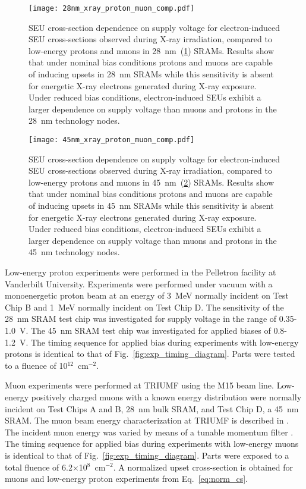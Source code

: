 \begin{figure}[tb]
    \begin{center}
        \texttt{[image: 28nm\_xray\_proton\_muon\_comp.pdf]}
    \end{center}
    \caption{SEU cross-section dependence on supply voltage for electron-induced SEU cross-sections observed during X-ray irradiation, compared to low-energy protons and muons in 28~nm~(\ref{fig:28nm_xray_muon_proton}) SRAMs. Results show that under nominal bias conditions protons and muons are capable of inducing upsets in 28~nm SRAMs while this sensitivity is absent for energetic X-ray electrons generated during X-ray exposure. Under reduced bias conditions, electron-induced SEUs exhibit a larger dependence on supply voltage than muons and protons in the 28~nm technology nodes.}
    \label{fig:28nm_xray_muon_proton}
\end{figure}
\begin{figure}[tb]
    \begin{center}
        \texttt{[image: 45nm\_xray\_proton\_muon\_comp.pdf]}
    \end{center}
    \caption{SEU cross-section dependence on supply voltage for electron-induced SEU cross-sections observed during X-ray irradiation, compared to low-energy protons and muons in 45~nm~(\ref{fig:45nm_xray_muon_proton}) SRAMs. Results show that under nominal bias conditions protons and muons are capable of inducing upsets in 45~nm SRAMs while this sensitivity is absent for energetic X-ray electrons generated during X-ray exposure. Under reduced bias conditions, electron-induced SEUs exhibit a larger dependence on supply voltage than muons and protons in the 45~nm technology nodes.}
    \label{fig:45nm_xray_muon_proton}
\end{figure}

Low-energy proton experiments were performed in the Pelletron facility at Vanderbilt University. 
Experiments were performed under vacuum with a monoenergetic proton beam at an energy of 3~MeV normally incident on Test Chip B and 1~MeV normally incident on Test Chip D. 
The sensitivity of the 28~nm SRAM test chip was investigated for supply voltage in the range of 0.35-1.0~V. 
The 45~nm SRAM test chip was investigated for applied biases of 0.8-1.2~V. 
The timing sequence for applied bias during experiments with low-energy protons is identical to that of Fig.~\ref{fig:exp_timing_diagram}. 
Parts were tested to a fluence of 10$^{12}$~cm$^{-2}$.

Muon experiments were performed at TRIUMF using the M15 beam line. 
Low-energy positively charged muons with a known energy distribution were normally incident on Test Chips A and B, 28~nm bulk SRAM, and Test Chip D, a 45~nm SRAM. 
The muon beam energy characterization at TRIUMF is described in \cite{Sierawski:2010cj}. 
The incident muon energy was varied by means of a tunable momentum filter \cite{Sierawski:2010cj, Sierawski:2011bn}. 
The timing sequence for applied bias during experiments with low-energy muons is identical to that of Fig.~\ref{fig:exp_timing_diagram}.
Parts were exposed to a total fluence of 6.2$\times$10$^8$~cm$^{-2}$. A normalized upset cross-section is obtained for muons and low-energy proton experiments from Eq.~\ref{eq:norm_cs}.

